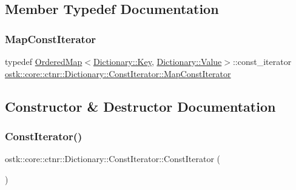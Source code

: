 \subsection{Member Typedef Documentation}
\mbox{\label{classostk_1_1core_1_1ctnr_1_1_dictionary_1_1_const_iterator_a7c7a0e5a0a15da39cbb2115306fdef4c}} 
\subsubsection{\texorpdfstring{Map\+Const\+Iterator}{MapConstIterator}}
{\footnotesize\ttfamily typedef \hyperlink{namespaceostk_1_1core_1_1ctnr_a13ac23065e75eb425f38bfca4d0c6b38}{Ordered\+Map}$<$\hyperlink{classostk_1_1core_1_1ctnr_1_1_dictionary_aa3b171525039535f342d271d27f90407}{Dictionary\+::\+Key}, \hyperlink{classostk_1_1core_1_1ctnr_1_1_dictionary_ace6ab82268031e972455affca8730c9c}{Dictionary\+::\+Value}$>$\+::const\+\_\+iterator \hyperlink{classostk_1_1core_1_1ctnr_1_1_dictionary_1_1_const_iterator_a7c7a0e5a0a15da39cbb2115306fdef4c}{ostk\+::core\+::ctnr\+::\+Dictionary\+::\+Const\+Iterator\+::\+Map\+Const\+Iterator}}



\subsection{Constructor \& Destructor Documentation}
\mbox{\label{classostk_1_1core_1_1ctnr_1_1_dictionary_1_1_const_iterator_a308d67ac775d7f6e024546a68bdd2fb4}} 
\subsubsection{\texorpdfstring{Const\+Iterator()}{ConstIterator()}\hspace{0.1cm}{\footnotesize\ttfamily [1/4]}}
{\footnotesize\ttfamily ostk\+::core\+::ctnr\+::\+Dictionary\+::\+Const\+Iterator\+::\+Const\+Iterator (\begin{DoxyParamCaption}{ }\end{DoxyParamCaption})}

